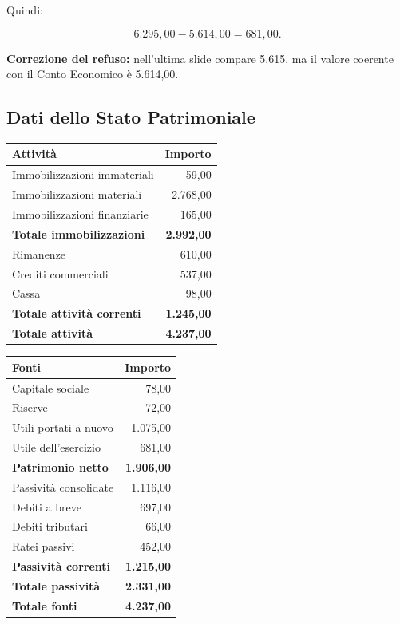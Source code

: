 \noindent Quindi:

\[
6.295{,}00-5.614{,}00
=
681{,}00.
\]

\noindent \textbf{Correzione del refuso:}
nell'ultima slide compare 5.615,
ma il valore coerente
con il Conto Economico
è 5.614,00.


\subsection*{Dati dello Stato Patrimoniale}

\begin{center}
    \begin{tabular}{|l|r|}
        \hline
        \textbf{Attività} & \textbf{Importo} \\
        \hline
        Immobilizzazioni immateriali & 59,00 \\
        Immobilizzazioni materiali & 2.768,00 \\
        Immobilizzazioni finanziarie & 165,00 \\
        \textbf{Totale immobilizzazioni} & \textbf{2.992,00} \\
        \hline
        Rimanenze & 610,00 \\
        Crediti commerciali & 537,00 \\
        Cassa & 98,00 \\
        \textbf{Totale attività correnti} & \textbf{1.245,00} \\
        \hline
        \textbf{Totale attività} & \textbf{4.237,00} \\
        \hline
    \end{tabular}
\end{center}

\begin{center}
    \begin{tabular}{|l|r|}
        \hline
        \textbf{Fonti} & \textbf{Importo} \\
        \hline
        Capitale sociale & 78,00 \\
        Riserve & 72,00 \\
        Utili portati a nuovo & 1.075,00 \\
        Utile dell'esercizio & 681,00 \\
        \textbf{Patrimonio netto} & \textbf{1.906,00} \\
        \hline
        Passività consolidate & 1.116,00 \\
        \hline
        Debiti a breve & 697,00 \\
        Debiti tributari & 66,00 \\
        Ratei passivi & 452,00 \\
        \textbf{Passività correnti} & \textbf{1.215,00} \\
        \hline
        \textbf{Totale passività} & \textbf{2.331,00} \\
        \hline
        \textbf{Totale fonti} & \textbf{4.237,00} \\
        \hline
    \end{tabular}
\end{center}

